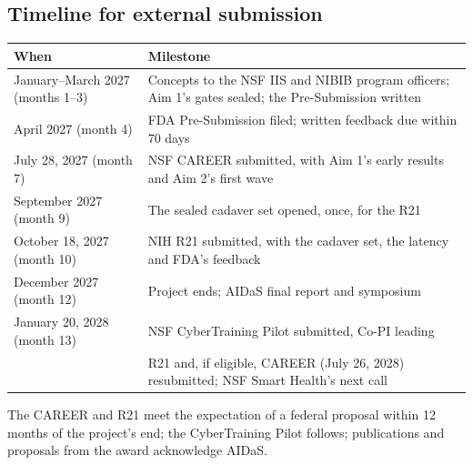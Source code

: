 \documentclass[10pt,letterpaper]{article}
\begin{document}
\subsection*{Timeline for external submission}
{\small
\begin{tabularx}{\linewidth}{@{}>{\raggedright\arraybackslash}p{1.95in}X@{}}
\toprule
When & Milestone\\
\midrule
January--March 2027 (months 1--3) & Concepts to the NSF IIS and NIBIB program officers; Aim 1's gates sealed; the Pre-Submission written\\
April 2027 (month 4) & FDA Pre-Submission filed; written feedback due within 70 days\\
July 28, 2027 (month 7) & NSF CAREER submitted, with Aim 1's early results and Aim 2's first wave\\
September 2027 (month 9) & The sealed cadaver set opened, once, for the R21\\
October 18, 2027 (month 10) & NIH R21 submitted, with the cadaver set, the latency and FDA's feedback\\
December 2027 (month 12) & Project ends; AIDaS final report and symposium\\
January 20, 2028 (month 13) & NSF CyberTraining Pilot submitted, Co-PI leading\\
2028 & R21 and, if eligible, CAREER (July 26, 2028) resubmitted; NSF Smart Health's next call\\
\bottomrule
\end{tabularx}}

The CAREER and R21 meet the expectation of a federal proposal within 12 months of the project's end; the CyberTraining Pilot follows; publications and proposals from the award acknowledge AIDaS.

\clearpage
\end{document}
